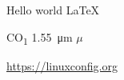 \documentclass{article}
\begin{document}
Hello world \LaTeX

CO\textsubscript{1}
\SI{1.55}{\micro\metre}
$\mu$




\url{https://linuxconfig.org}
\end{document}
